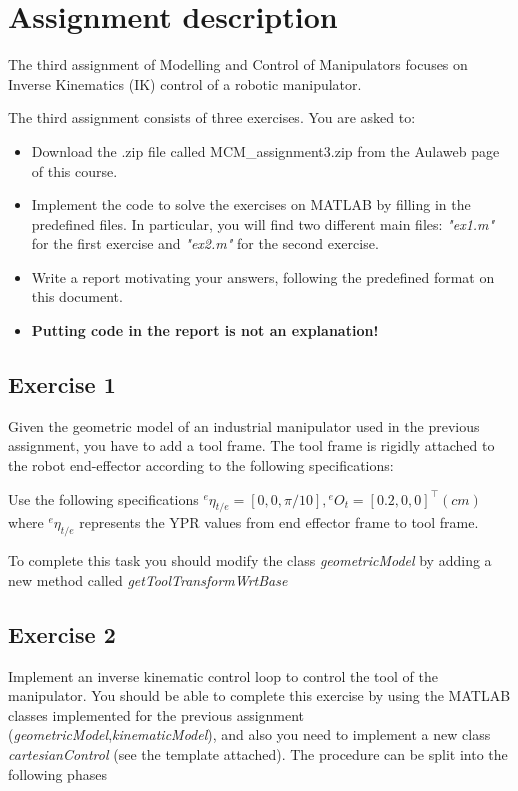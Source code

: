\section{Assignment description}
The third assignment of Modelling and Control of Manipulators focuses on Inverse Kinematics (IK) control of a robotic manipulator.

The third assignment consists of three exercises. You are asked to:
\begin{itemize}
    \item Download the .zip file called MCM\_assignment3.zip from the Aulaweb page of this course.
    \item Implement the code to solve the exercises on MATLAB by filling in the predefined files. In particular, you will find two different main files: \textit{"ex1.m"} for the first exercise and \textit{"ex2.m"} for the second exercise.
    \item Write a report motivating your answers, following the predefined format on this document.
    \item \textbf{Putting code in the report is not an explanation!}
\end{itemize}

\subsection{Exercise 1}

Given the geometric model of an industrial manipulator used in the previous assignment, you have to add a tool frame.
The tool frame is rigidly attached to the robot end-effector according to the following specifications:  

Use the following specifications
$ {}^e \eta_{t/e}=[0,0,\pi/10], {}^eO_t=[0.2,0,0]^{\top}(cm)$ 
where ${}^e\eta_{t/e}$ represents the YPR values from end effector frame to tool frame.

To complete this task you should modify the class \textit{geometricModel} by adding a new method called \textit{getToolTransformWrtBase}

\subsection{Exercise 2}

Implement an inverse kinematic control loop to control the tool of the manipulator. You should be able to complete this exercise by using the MATLAB classes implemented for the previous assignment (\textit{geometricModel},\textit{kinematicModel}), and also you need to implement a new class \textit{cartesianControl} (see the template attached). The procedure can be split into the following phases

